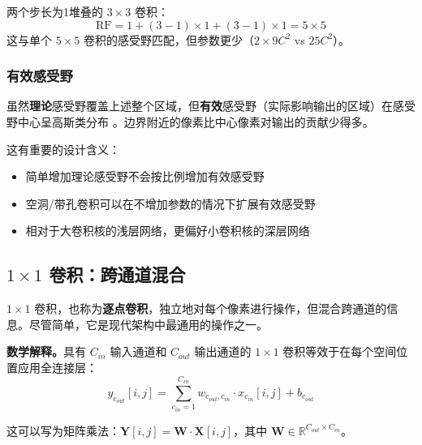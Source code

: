\begin{example}[两个 $3 \times 3$ 卷积]
两个步长为1堆叠的 $3 \times 3$ 卷积：
\begin{equation}
\text{RF} = 1 + (3 - 1) \times 1 + (3 - 1) \times 1 = 5 \times 5
\end{equation}
这与单个 $5 \times 5$ 卷积的感受野匹配，但参数更少（$2 \times 9C^2$ vs $25C^2$）。
\end{example}

\subsubsection{有效感受野}

虽然\textbf{理论}感受野覆盖上述整个区域，但\textbf{有效}感受野（实际影响输出的区域）在感受野中心呈高斯类分布 \cite{luo2016understanding}。边界附近的像素比中心像素对输出的贡献少得多。

这有重要的设计含义：
\begin{itemize}
    \item 简单增加理论感受野不会按比例增加有效感受野
    \item 空洞/带孔卷积可以在不增加参数的情况下扩展有效感受野
    \item 相对于大卷积核的浅层网络，更偏好小卷积核的深层网络
\end{itemize}

\subsection{\texorpdfstring{$1 \times 1$}{1x1} 卷积：跨通道混合}

$1 \times 1$ 卷积，也称为\textbf{逐点卷积}，独立地对每个像素进行操作，但混合跨通道的信息。尽管简单，它是现代架构中最通用的操作之一。

\textbf{数学解释。}具有 $C_{in}$ 输入通道和 $C_{out}$ 输出通道的 $1 \times 1$ 卷积等效于在每个空间位置应用全连接层：
\begin{equation}
y_{c_{out}}[i, j] = \sum_{c_{in}=1}^{C_{in}} w_{c_{out}, c_{in}} \cdot x_{c_{in}}[i, j] + b_{c_{out}}
\end{equation}

这可以写为矩阵乘法：$\mathbf{Y}[i,j] = \mathbf{W} \cdot \mathbf{X}[i,j]$，其中 $\mathbf{W} \in \mathbb{R}^{C_{out} \times C_{in}}$。

